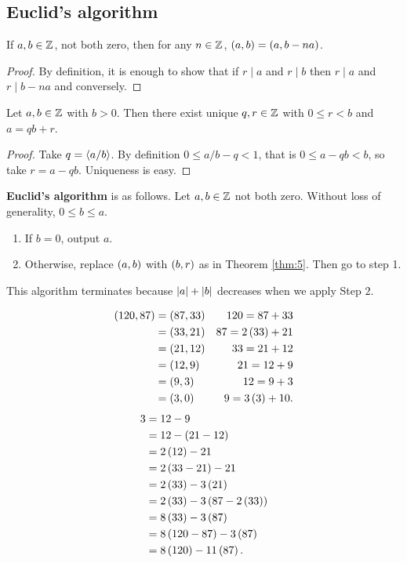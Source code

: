\subsection{Euclid's algorithm}

\begin{proposition}
If $ a, b \in \mathbb{Z} $, not both zero, then for any $ n \in \mathbb{Z} $, $ \left( a, b \right) = \left( a, b - na \right) $.
\end{proposition}

\begin{proof}
By definition, it is enough to show that if $ r \mid a $ and $ r \mid b $ then $ r \mid a $ and $ r \mid b - na $ and conversely.
\end{proof}

\begin{theorem}
\label{thm:5}
Let $ a, b \in \mathbb{Z} $ with $ b > 0 $. Then there exist unique $ q, r \in \mathbb{Z} $ with $ 0 \le r < b $ and $ a = qb + r $.
\end{theorem}

\begin{proof}
Take $ q = \left\langle a / b \right\rangle $. By definition $ 0 \le a / b - q < 1 $, that is $ 0 \le a - qb < b $, so take $ r = a - qb $. Uniqueness is easy.
\end{proof}

\textbf{Euclid's algorithm} is as follows. Let $ a, b \in \mathbb{Z} $ not both zero. Without loss of generality, $ 0 \le b \le a $.
\begin{enumerate}[leftmargin=0.5in, label=Step \arabic*.]
\item If $ b = 0 $, output $ a $.
\item Otherwise, replace $ \left( a, b \right) $ with $ \left( b, r \right) $ as in Theorem \ref{thm:5}. Then go to step 1.
\end{enumerate}
This algorithm terminates because $ \left\lvert a \right\rvert + \left\lvert b \right\rvert $ decreases when we apply Step $ 2 $.

\begin{example2}
\begin{align*}
\left( 120, 87 \right)
& = \left( 87, 33 \right) & 120 = 87 + 33 \\
& = \left( 33, 21 \right) & 87 = 2\left( 33 \right) + 21 \\
& = \left( 21, 12 \right) & 33 = 21 + 12 \\
& = \left( 12, 9 \right) & 21 = 12 + 9 \\
& = \left( 9, 3 \right) & 12 = 9 + 3 \\
& = \left( 3, 0 \right) & 9 = 3\left( 3 \right) + 10.
\end{align*}
\begin{align*}
3
& = 12 - 9 \\
& = 12 - \left( 21 - 12 \right) \\
& = 2\left( 12 \right) - 21 \\
& = 2\left( 33 - 21 \right) - 21 \\
& = 2\left( 33 \right) - 3\left( 21 \right) \\
& = 2\left( 33 \right) - 3\left( 87 - 2\left( 33 \right) \right) \\
& = 8\left( 33 \right) - 3\left( 87 \right) \\
& = 8\left( 120 - 87 \right) - 3\left( 87 \right) \\
& = 8\left( 120 \right) - 11\left( 87 \right).
\end{align*}
\end{example2}

